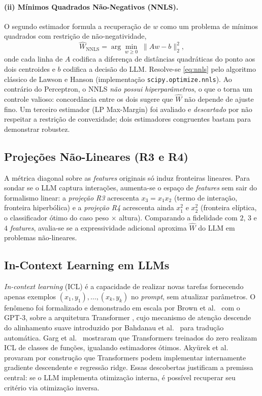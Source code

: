 \documentclass[12pt,a4paper]{article}
\newcommand{\West}{\ensuremath{\hat{W}}}   %
\begin{document}
\paragraph{(ii) Mínimos Quadrados Não-Negativos (NNLS).}
O segundo estimador formula a recuperação de $w$ como um problema de mínimos quadrados com
restrição de não-negatividade,
\begin{equation}
  \West_{\text{NNLS}} = \arg\min_{w \geq 0} \; \lVert A w - b \rVert_2^2,
  \label{eq:nnls}
\end{equation}
onde cada linha de $A$ codifica a diferença de distâncias quadráticas do ponto aos dois
centroides e $b$ codifica a decisão do LLM. Resolve-se \eqref{eq:nnls} pelo algoritmo
clássico de Lawson e Hanson \cite{lawsonSolvingLeastSquares1974} (implementação
\texttt{scipy.optimize.nnls}). Ao contrário do Perceptron, o NNLS \emph{não possui
hiperparâmetros}, o que o torna um controle valioso: concordância entre os dois sugere que
\West{} não depende de ajuste fino. Um terceiro estimador (LP Max-Margin) foi avaliado e
\emph{descartado} por não respeitar a restrição de convexidade; dois estimadores congruentes
bastam para demonstrar robustez.

\subsection{Projeções Não-Lineares (R3 e R4)}
\label{sec:r3r4}

A métrica diagonal sobre as \emph{features} originais só induz fronteiras lineares. Para
sondar se o LLM captura interações, aumenta-se o espaço de \emph{features} sem sair do
formalismo linear: a \emph{projeção R3} acrescenta $x_3 = x_1 x_2$ (termo de interação,
fronteira hiperbólica) e a \emph{projeção R4} acrescenta ainda $x_1^2$ e $x_2^2$ (fronteira
elíptica, o classificador ótimo do caso peso $\times$ altura). Comparando a fidelidade com
$2$, $3$ e $4$ \emph{features}, avalia-se se a expressividade adicional aproxima \West{} do
LLM em problemas não-lineares.

\subsection{In-Context Learning em LLMs}

\emph{In-context learning} (ICL) é a capacidade de realizar novas tarefas fornecendo apenas
exemplos $(x_1,y_1),\ldots,(x_k,y_k)$ no \emph{prompt}, sem atualizar parâmetros. O
fenômeno foi formalizado e demonstrado em escala por Brown et
al.~\cite{brownLanguageModels2020} com o GPT-3, sobre a arquitetura Transformer
\cite{vaswaniAttention2017}, cujo mecanismo de atenção descende do alinhamento suave
introduzido por Bahdanau et al.~\cite{bahdanauNeuralMachine2015} para tradução
automática. Garg et
al.~\cite{gargWhatTransformers2022} mostraram que Transformers treinados do zero realizam
ICL de classes de funções, igualando estimadores ótimos. Akyürek et
al.~\cite{akyurekWhatLearning2023} provaram por construção que Transformers podem implementar
internamente gradiente descendente e regressão ridge. Essas descobertas justificam a premissa
central: se o LLM implementa otimização interna, é possível recuperar seu critério via
otimização inversa.
\end{document}
